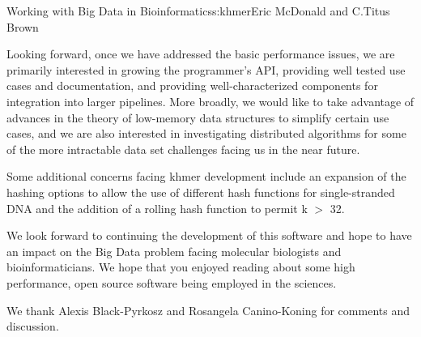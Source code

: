 \begin{aosachapter}{Working with Big Data in Bioinformatics}{s:khmer}{Eric McDonald and C.\/Titus Brown}

Looking forward, once we have addressed the basic performance issues, we
are primarily interested in growing the programmer's API, providing well
tested use cases and documentation, and providing well-characterized
components for integration into larger pipelines. More broadly, we would
like to take advantage of advances in the theory of low-memory data
structures to simplify certain use cases, and we are also interested in
investigating distributed algorithms for some of the more intractable
data set challenges facing us in the near future.

Some additional concerns facing khmer development include an expansion
of the hashing options to allow the use of different hash functions for
single-stranded DNA and the addition of a rolling hash function to
permit k $>$ 32.

We look forward to continuing the development of this software and hope
to have an impact on the Big Data problem facing molecular biologists
and bioinformaticians. We hope that you enjoyed reading about some high
performance, open source software being employed in the sciences.


We thank Alexis Black-Pyrkosz and Rosangela Canino-Koning for comments
and discussion.

\end{aosachapter}
